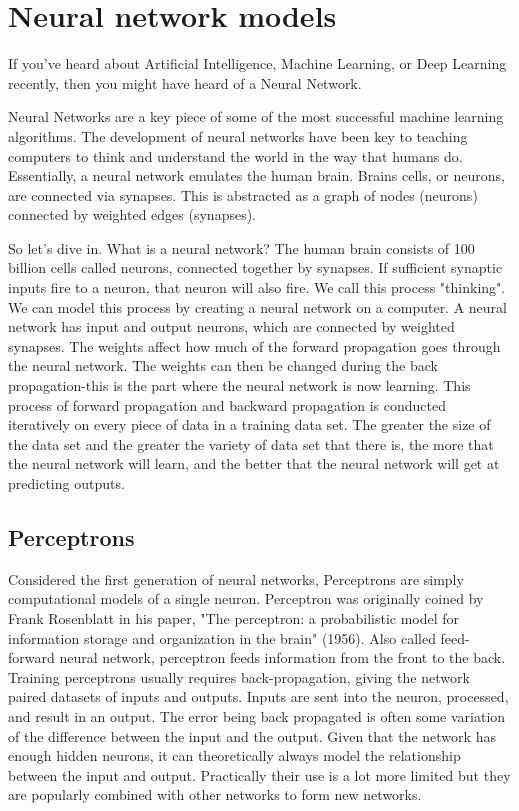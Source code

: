\section{Neural network models}

If you've heard about Artificial Intelligence, Machine Learning, or Deep Learning recently, then you might have heard of a Neural Network.

Neural Networks are a key piece of some of the most successful machine learning algorithms. The development of neural networks have been key to teaching computers to think and understand the world in the way that humans do. Essentially, a neural network emulates the human brain. Brains cells, or neurons, are connected via synapses. This is abstracted as a graph of nodes (neurons) connected by weighted edges (synapses).

So let's dive in. What is a neural network? The human brain consists of 100 billion cells called neurons, connected together by synapses. If sufficient synaptic inputs fire to a neuron, that neuron will also fire. We call this process "thinking". We can model this process by creating a neural network on a computer. A neural network has input and output neurons, which are connected by weighted synapses. The weights affect how much of the forward propagation goes through the neural network. The weights can then be changed during the back propagation-this is the part where the neural network is now learning. This process of forward propagation and backward propagation is conducted iteratively on every piece of data in a training data set. The greater the size of the data set and the greater the variety of data set that there is, the more that the neural network will learn, and the better that the neural network will get at predicting outputs.


\subsection{Perceptrons}
 
Considered the first generation of neural networks, Perceptrons are simply computational models of a single neuron. Perceptron was originally coined by Frank Rosenblatt in his paper, "The perceptron: a probabilistic model for information storage and organization in the brain" (1956). Also called feed-forward neural network, perceptron feeds information from the front to the back. Training perceptrons usually requires back-propagation, giving the network paired datasets of inputs and outputs. Inputs are sent into the neuron, processed, and result in an output. The error being back propagated is often some variation of the difference between the input and the output. Given that the network has enough hidden neurons, it can theoretically always model the relationship between the input and output. Practically their use is a lot more limited but they are popularly combined with other networks to form new networks.


